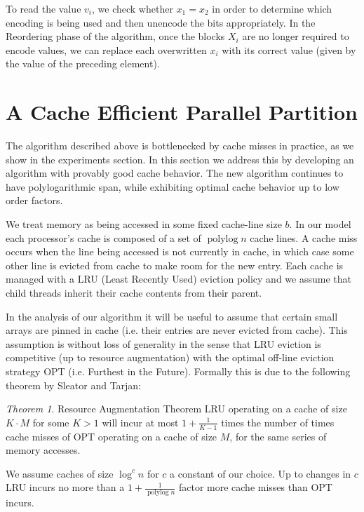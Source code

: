 \documentclass[sigconf]{acmart}
\renewcommand{\paragraph}[1]{\vspace{0.09in}\noindent{\bf \boldmath #1.}}
\theoremstyle{remark}
\newtheorem{theorem}{Theorem}[section]
\theoremstyle{remark}
\begin{document}
To read the value $v_i$, we check whether $x_1 = x_2$ in order to
determine which encoding is being used and then unencode the bits
appropriately. In the Reordering phase of the algorithm, once the
blocks $X_i$ are no longer required to encode values, we can replace
each overwritten $x_i$ with its correct value (given by the value of
the preceding element).

\section{A Cache Efficient Parallel Partition}

The algorithm described above is bottlenecked by cache misses in practice, as we show in the experiments section. 
In this section we address this by developing an algorithm with provably good cache behavior. 
The new algorithm continues to have polylogarithmic span, while exhibiting optimal cache behavior up to low order factors.

\paragraph{Modelling Cache Misses}
We treat memory as being accessed in some fixed cache-line size $b$. 
In our model each processor's cache is composed of a set of $\operatorname{polylog}{n}$ cache lines.
A cache miss occurs when the line being accessed is not currently in cache, in which case some other line is evicted from cache to make room for the new entry.
Each cache is managed with a LRU (Least Recently Used) eviction policy and we assume that child threads inherit their cache contents from their parent.

In the analysis of our algorithm it will be useful to assume that certain small arrays are pinned in cache (i.e. their entries are never evicted from cache).
This assumption is without loss of generality in the sense that LRU eviction is competitive (up to resource augmentation) with the optimal off-line eviction strategy OPT (i.e. Furthest in the Future).
Formally this is due to the following theorem by Sleator and Tarjan:
\begin{theorem}{Resource Augmentation Theorem \cite{SleatorTa85}}
	LRU operating on a cache of size $K\cdot M$ for some $K>1$ will incur at most $1+\frac{1}{K-1}$ times the number of times cache misses of OPT operating on a cache of size $M$, for the same series of memory accesses.
\end{theorem}

We assume caches of size $\log^c n$ for $c$ a constant of our choice. 
Up to changes in $c$ LRU incurs no more than a $1+\frac{1}{\operatorname{polylog}{n}}$ factor more cache misses than OPT incurs.
\end{document}
